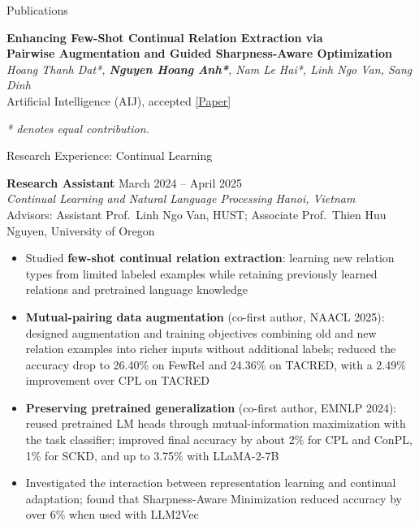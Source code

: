 \documentclass{resume}
\begin{document}
\begin{rSection}{Publications}
\begin{enumerate}[leftmargin=1.8em,label={[\arabic*]},itemsep=0em,topsep=0.1em]
    \item
    \textbf{Enhancing Few-Shot Continual Relation Extraction via\\
    Pairwise Augmentation and Guided Sharpness-Aware Optimization}\\
    \textit{Hoang Thanh Dat*, \textbf{Nguyen Hoang Anh*}, Nam Le Hai*,
    Linh Ngo Van, Sang Dinh}\\
    Artificial Intelligence (AIJ), accepted
    \href{https://www.sciencedirect.com/science/article/pii/S0004370226001712}{[Paper]}

\end{enumerate}
\textit{* denotes equal contribution.}

\end{rSection}

\begin{rSection}{Research Experience: Continual Learning}

\textbf{Research Assistant} \hfill March 2024 -- April 2025\\
\textit{Continual Learning and Natural Language Processing}
\hfill \textit{Hanoi, Vietnam}\\
Advisors: Assistant Prof.\ Linh Ngo Van, HUST;
Associate Prof.\ Thien Huu Nguyen, University of Oregon

\begin{itemize}[leftmargin=1.5em,itemsep=0em,topsep=0.1em]
    \item Studied \textbf{few-shot continual relation extraction}: learning new
    relation types from limited labeled examples while retaining previously
    learned relations and pretrained language knowledge
    \item \textbf{Mutual-pairing data augmentation} (co-first author, NAACL 2025):
    designed augmentation and training objectives combining old and new relation
    examples into richer inputs without additional labels; reduced the accuracy drop to
    26.40\% on FewRel and 24.36\% on TACRED, with a 2.49\% improvement over
    CPL on TACRED
    \item \textbf{Preserving pretrained generalization} (co-first author, EMNLP 2024):
    reused pretrained LM heads through mutual-information maximization with the
    task classifier; improved final accuracy by about 2\% for CPL and ConPL,
    1\% for SCKD, and up to 3.75\% with LLaMA-2-7B
    \item Investigated the interaction between representation learning and
    continual adaptation; found that Sharpness-Aware Minimization reduced
    accuracy by over 6\% when used with LLM2Vec
\end{itemize}

\end{rSection}
\end{document}
